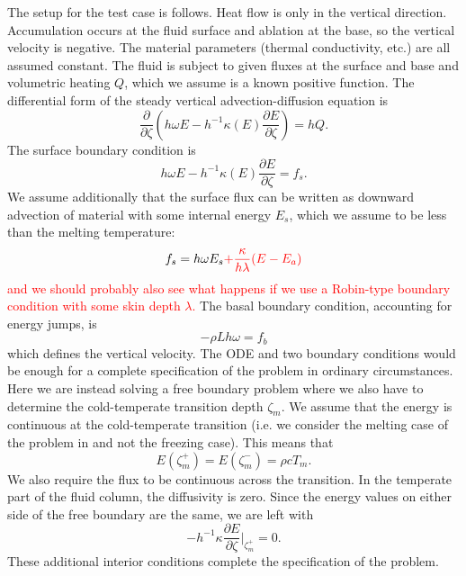 \documentclass{article}
\theoremstyle{definition}
\theoremstyle{plain}
\begin{document}
The setup for the test case is follows.
Heat flow is only in the vertical direction.
Accumulation occurs at the fluid surface and ablation at the base, so the vertical velocity is negative.
The material parameters (thermal conductivity, etc.) are all assumed constant.
The fluid is subject to given fluxes at the surface and base and volumetric heating $Q$, which we assume is a known positive function.
The differential form of the steady vertical advection-diffusion equation is
\begin{equation}
    \frac{\partial}{\partial\zeta} \left(h\omega E - h^{-1}\kappa(E)\frac{\partial E}{\partial\zeta}\right) = hQ.
\end{equation}
The surface boundary condition is
\begin{equation}
    h\omega E - h^{-1}\kappa(E)\frac{\partial E}{\partial\zeta} = f_s.
\end{equation}
We assume additionally that the surface flux can be written as downward advection of material with some internal energy $E_s$, which we assume to be less than the melting temperature:
\begin{equation}
    f_s = h\omega E_s \textcolor{red}{+ \frac{\kappa}{h\lambda}(E - E_a)}
\end{equation}
\textcolor{red}{and we should probably also see what happens if we use a Robin-type boundary condition with some skin depth $\lambda$.}
The basal boundary condition, accounting for energy jumps, is
\begin{equation}
    -\rho Lh\omega = f_b
\end{equation}
which defines the vertical velocity.
The ODE and two boundary conditions would be enough for a complete specification of the problem in ordinary circumstances.
Here we are instead solving a free boundary problem where we also have to determine the cold-temperate transition depth $\zeta_m$.
We assume that the energy is continuous at the cold-temperate transition (i.e. we consider the melting case of the problem in \citet{greve2009dynamics} and not the freezing case).
This means that
\begin{equation}
    E(\zeta_m^+) = E(\zeta_m^-) = \rho cT_m.
\end{equation}
We also require the flux to be continuous across the transition.
In the temperate part of the fluid column, the diffusivity is zero.
Since the energy values on either side of the free boundary are the same, we are left with
\begin{equation}
    -h^{-1}\kappa\frac{\partial E}{\partial\zeta}\Big|_{\zeta_m^+} = 0.
\end{equation}
These additional interior conditions complete the specification of the problem.
\end{document}
